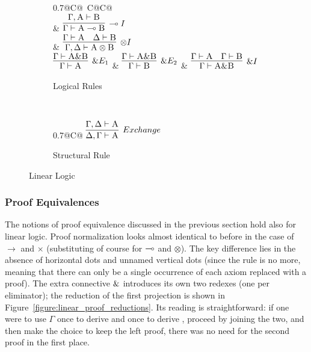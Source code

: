 \begin{figure}
	\centering
	\begin{subfigure}{1\textwidth}
		\centering
		\begin{tabularx}{0.7\textwidth}{@{}C@{~}C@{\qquad}C@{}}
		\\[1em]
		& 
		$\infer[\li I]{\Gamma \vdash \prop A \li \prop B}{\Gamma, \prop A \vdash \prop B}$\\[1em]
		&
		$\infer[\otimes I]{\Gamma, \Delta \vdash \prop A \otimes \prop B}{\Gamma \vdash \prop A & \Delta \vdash \prop B}$\\[1em]
		$
		\infer[\with E_1]{\Gamma \vdash \prop{A}}{\Gamma \vdash \prop{A} \with \prop{B}}
		$
		&
		$
		\infer[\with E_2]{\Gamma \vdash \prop{B}}{\Gamma \vdash \prop{A} \with \prop{B}}
		$
		&
		$
		\infer[\with I]{\Gamma \vdash \prop{A} \with \prop{B}}{\Gamma \vdash \prop{A} & \Gamma \vdash \prop{B}}
		$
		\end{tabularx}
		\caption{Logical Rules}
		\label{subfigure:linear_logic_rules:logical}
	\end{subfigure}\\[2em]
	\begin{subfigure}{1\textwidth}
		\centering
		\begin{tabularx}{0.7\textwidth}{@{}C@{}}
		$
		\infer[\Exchange{}]{\Delta, \Gamma \vdash \prop{A}}{\Gamma, \Delta \vdash \prop{A}}
		$
		\end{tabularx}
		\caption{Structural Rule}
		\label{subfigure:linear_logic_rules:structural}
	\end{subfigure}
	\caption{Linear Logic}
	\label{figure:linear_logic_rules}
\end{figure}

\subsubsection{Proof Equivalences}
The notions of proof equivalence discussed in the previous section hold also for linear logic.
Proof normalization looks almost identical to before in the case of $\to$ and $\times$ (substituting of course for $\multimap$ and $\otimes$).
The key difference lies in the absence of horizontal dots and unnamed vertical dots (since the \Contraction{} rule is no more, meaning that there can only be a single occurrence of each axiom replaced with a proof).
The extra connective $\&$ introduces its own two redexes (one per eliminator); the reduction of the first projection is shown in Figure~\ref{figure:linear_proof_reductions}. 
Its reading is straightforward: if one were to use $\Gamma$ once to derive  and once to derive , proceed by joining the two, and then make the choice to keep the left proof, there was no need for the second proof in the first place.

